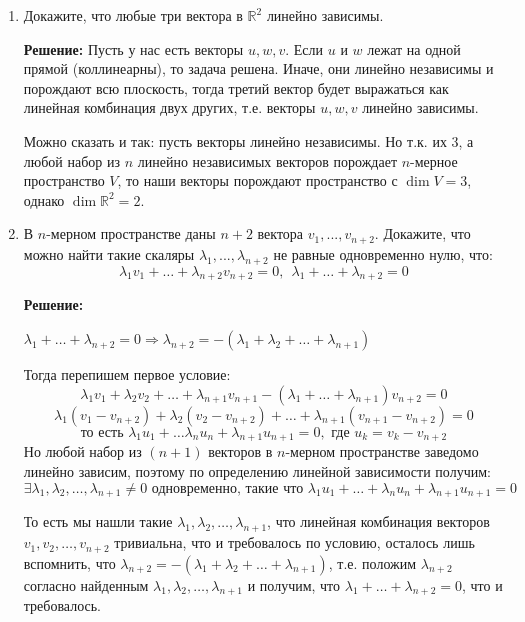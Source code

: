 \documentclass[]{book}
\theoremstyle{definition}
\newcommand{\bb}[1]{\mathbb{#1}}
\newcommand{\R}{\bb{R}}
\begin{document}
\begin{enumerate}[resume]


\item Докажите, что любые три вектора в $\bb{R}^2$ линейно зависимы.

\textbf{Решение:}
Пусть у нас есть векторы $u, w, v$. Если $u$ и $w$ лежат на одной прямой (коллинеарны), то задача решена. Иначе, они линейно независимы и порождают всю плоскость, тогда третий вектор будет выражаться как линейная комбинация двух других, т.е. векторы $u, w, v$ линейно зависимы.

Можно сказать и так: пусть векторы линейно независимы. Но т.к. их 3, а любой набор из $n$ линейно независимых векторов порождает $n$-мерное пространство $V$, то наши векторы порождают пространство с $\dim V = 3$, однако $\dim \R^2 = 2$.



\item В $n$-мерном пространстве даны $n+2$ вектора $v_1, ..., v_{n+2}$. Докажите, что можно найти такие скаляры  ${\lambda}_{1}, ..., {\lambda}_{n+2}$ не равные одновременно нулю, что:
$$\lambda_{1}v_1+ \ldots +{\lambda}_{n+2}v_{n+2} =0, \ \ {\lambda}_{1} + \ldots + {\lambda}_{n+2} = 0 $$

\textbf{Решение:}

${\lambda}_{1} + \ldots + {\lambda}_{n+2} =0 \Longrightarrow \lambda_{n+2} = - \left(\lambda_1 + \lambda_2 + \ldots + \lambda_{n+1} \right)$

Тогда перепишем первое условие:
$$\lambda_{1}v_1+ \lambda_2 v_2 +  \ldots + \lambda_{n+1} v_{n+1} - \left(\lambda_{1} + \ldots + \lambda_{n+1}\right)v_{n+2} =0$$
$$\lambda_1(v_1 - v_{n+2}) + \lambda_2(v_2 - v_{n+2}) + \ldots + \lambda_{n+1}(v_{n+1} - v_{n+2}) = 0$$
$$\text{то есть } \lambda_1 u_1 + \ldots \lambda_n u_n + \lambda_{n+1} u_{n+1} = 0, \text{ где } u_k = v_k - v_{n+2} $$
Но любой набор из $(n+1)$ векторов в $n$-мерном пространстве заведомо линейно зависим, поэтому по определению линейной зависимости получим:
$$\exists \lambda_1, \lambda_ 2, \ldots, \lambda_{n+1} \neq 0 \text{ одновременно, такие что }\lambda_1 u_1 + \ldots + \lambda_n u_n + \lambda_{n+1} u_{n+1} = 0$$

То есть мы нашли такие $\lambda_1, \lambda_ 2, \ldots, \lambda_{n+1}$, что линейная комбинация векторов $v_1, v_2, \ldots, v_{n+2}$ тривиальна, что и требовалось по условию, осталось лишь вспомнить, что $\lambda_{n+2} = - \left(\lambda_1 + \lambda_2 + \ldots + \lambda_{n+1} \right)$, т.е. положим $\lambda_{n+2}$ согласно найденным $\lambda_1, \lambda_ 2, \ldots, \lambda_{n+1}$ и получим, что ${\lambda}_{1} + \ldots + {\lambda}_{n+2} = 0 $, что и требовалось.


\end{enumerate}
\end{document}
